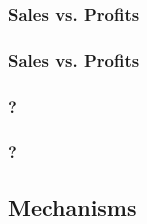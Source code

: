 \documentclass[hideothersubsections, usenames,dvipsnames,11pt]{beamer}
\newenvironment{itemize_2pt}{\itemize\addtolength{\itemsep}{2pt}}{\enditemize}
\begin{document}

\begin{frame}
\frametitle{Sales vs. Profits}
	\begin{itemize_2pt}
	\item  \citep{deMel2009}
	\vspace{0.1in}
	\end{itemize_2pt}
\end{frame}

\begin{frame}
\frametitle{Sales vs. Profits}
	\begin{itemize_2pt}
	\item \citep{deMel2009}
	\vspace{0.1in}
	\end{itemize_2pt}
\end{frame}


\begin{frame}
\frametitle{?}
\begin{itemize_2pt}
	\item 
	\vspace{0.1in}
\end{itemize_2pt}
\end{frame}

\begin{frame}
\frametitle{?}
\begin{itemize_2pt}
	\item 
	\vspace{0.1in}
\end{itemize_2pt}
\end{frame}


\subsection{Mechanisms}
\end{document}
